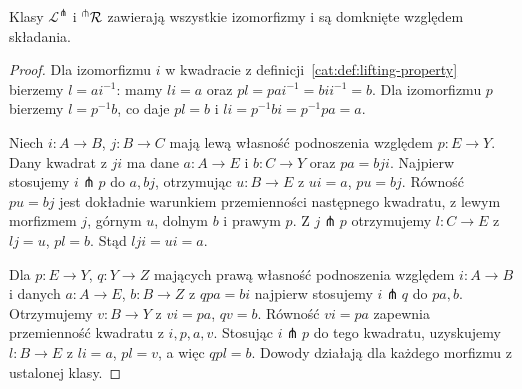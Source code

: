 \begin{stwierdzenie}\label{cat:prop:lifting-composition}
Klasy $\mathcal L^\pitchfork$ i $\vphantom{R}^\pitchfork\mathcal R$ zawierają wszystkie izomorfizmy i są domknięte względem składania.
\end{stwierdzenie}
\begin{proof}
Dla izomorfizmu $i$ w kwadracie z definicji~\ref{cat:def:lifting-property} bierzemy $l=ai^{-1}$: mamy $li=a$ oraz $pl=pai^{-1}=bii^{-1}=b$. Dla izomorfizmu $p$ bierzemy $l=p^{-1}b$, co daje $pl=b$ i $li=p^{-1}bi=p^{-1}pa=a$.

Niech $i:A\to B$, $j:B\to C$ mają lewą własność podnoszenia względem $p:E\to Y$. Dany kwadrat z $ji$ ma dane $a:A\to E$ i $b:C\to Y$ oraz $pa=bji$. Najpierw stosujemy $i\pitchfork p$ do $a,bj$, otrzymując $u:B\to E$ z $ui=a$, $pu=bj$. Równość $pu=bj$ jest dokładnie warunkiem przemienności następnego kwadratu, z lewym morfizmem $j$, górnym $u$, dolnym $b$ i prawym $p$. Z $j\pitchfork p$ otrzymujemy $l:C\to E$ z $lj=u$, $pl=b$. Stąd $lji=ui=a$.

Dla $p:E\to Y$, $q:Y\to Z$ mających prawą własność podnoszenia względem $i:A\to B$ i danych $a:A\to E$, $b:B\to Z$ z $qpa=bi$ najpierw stosujemy $i\pitchfork q$ do $pa,b$. Otrzymujemy $v:B\to Y$ z $vi=pa$, $qv=b$. Równość $vi=pa$ zapewnia przemienność kwadratu z $i,p,a,v$. Stosując $i\pitchfork p$ do tego kwadratu, uzyskujemy $l:B\to E$ z $li=a$, $pl=v$, a więc $qpl=b$. Dowody działają dla każdego morfizmu z ustalonej klasy.
\end{proof}

